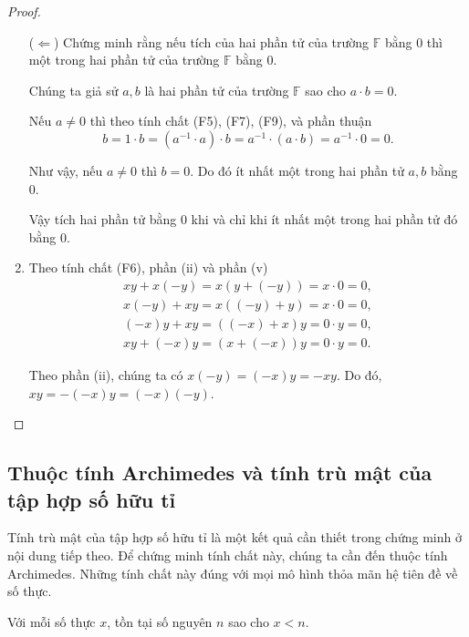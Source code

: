 \begin{proof}
\begin{enumerate}[label={(\roman*)},itemsep=0pt]
              ($\Leftarrow$) Chứng minh rằng nếu tích của hai phần tử của trường $\mathbb{F}$ bằng $0$ thì một trong hai phần tử của trường $\mathbb{F}$ bằng $0$.

              Chúng ta giả sử $a, b$ là hai phần tử của trường $\mathbb{F}$ sao cho $a\cdot b = 0$.

              Nếu $a\ne 0$ thì theo tính chất (F5), (F7), (F9), và phần thuận
              \[
                  b = 1\cdot b = (a^{-1}\cdot a)\cdot b = a^{-1}\cdot (a\cdot b) = a^{-1}\cdot 0 = 0.
              \]

              Như vậy, nếu $a\ne 0$ thì $b = 0$. Do đó ít nhất một trong hai phần tử $a, b$ bằng $0$.

              Vậy tích hai phần tử bằng $0$ khi và chỉ khi ít nhất một trong hai phần tử đó bằng $0$.
        \item Theo tính chất (F6), phần (ii) và phần (v)
              \[
                  \begin{split}
                      xy + x(-y) = x(y + (-y)) = x\cdot 0 = 0, \\
                      x(-y) + xy = x((-y) + y) = x\cdot 0 = 0, \\
                      (-x)y + xy = ((-x) + x)y = 0\cdot y = 0, \\
                      xy + (-x)y = (x + (-x))y = 0\cdot y = 0.
                  \end{split}
              \]

              Theo phần (ii), chúng ta có $x(-y) = (-x)y = -xy$. Do đó, $xy = -(-x)y = (-x)(-y)$.
    \end{enumerate}
\end{proof}

\subsection{Thuộc tính Archimedes và tính trù mật của tập hợp số hữu tỉ}

Tính trù mật của tập hợp số hữu tỉ là một kết quả cần thiết trong chứng minh ở nội dung tiếp theo. Để chứng minh tính chất này, chúng ta cần đến thuộc tính Archimedes. Những tính chất này đúng với mọi mô hình thỏa mãn hệ tiên đề về số thực.

\begin{theorem}
    Với mỗi số thực $x$, tồn tại số nguyên $n$ sao cho $x < n$.
\end{theorem}

